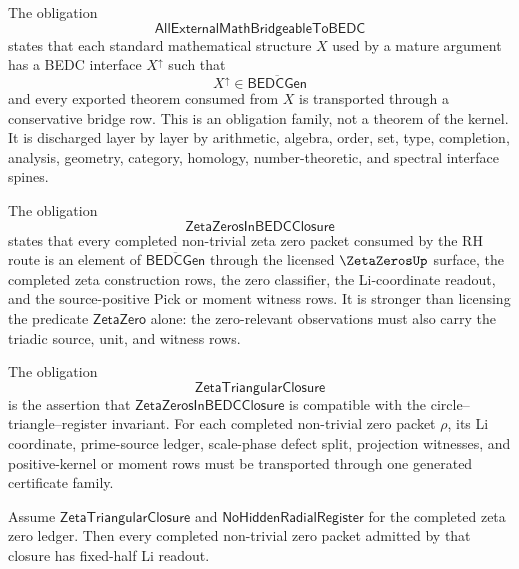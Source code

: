 \begin{definition}
\label{def:unified-reality-external-conservative-bridge-obligation}
The obligation
$$
\mathsf{AllExternalMathBridgeableToBEDC}
$$
states that each standard mathematical structure $X$ used by a mature
argument has a BEDC interface $X^{\uparrow}$ such that
$$
X^{\uparrow}\in\overline{\mathsf{BEDCGen}}
$$
and every exported theorem consumed from $X$ is transported through a
conservative bridge row. This is an obligation family, not a theorem of
the kernel. It is discharged layer by layer by arithmetic, algebra,
order, set, type, completion, analysis, geometry, category, homology,
number-theoretic, and spectral interface spines.
\end{definition}

\begin{definition}
\label{def:unified-reality-zeta-zeros-in-bedc-closure}
The obligation
$$
\mathsf{ZetaZerosInBEDCClosure}
$$
states that every completed non-trivial zeta zero packet consumed by the
RH route is an element of $\overline{\mathsf{BEDCGen}}$ through the
licensed $\ZetaZerosUp$ surface, the completed zeta construction rows,
the zero classifier, the Li-coordinate readout, and the source-positive
Pick or moment witness rows. It is stronger than licensing the predicate
$\mathsf{ZetaZero}$ alone: the zero-relevant observations must also
carry the triadic source, unit, and witness rows.
\end{definition}

\begin{definition}
\label{def:unified-reality-zeta-triangular-closure}
The obligation
$$
\mathsf{ZetaTriangularClosure}
$$
is the assertion that $\mathsf{ZetaZerosInBEDCClosure}$ is compatible
with the circle--triangle--register invariant. For each completed
non-trivial zero packet $\rho$, its Li coordinate, prime-source ledger,
scale-phase defect split, projection witnesses, and positive-kernel or
moment rows must be transported through one generated certificate
family.
\end{definition}

\begin{theorem}
\label{thm:unified-reality-universal-closure-conditionally-fixed-half}
Assume $\mathsf{ZetaTriangularClosure}$ and
$\mathsf{NoHiddenRadialRegister}$ for the completed zeta zero ledger.
Then every completed non-trivial zero packet admitted by that closure
has fixed-half Li readout.
\end{theorem}

